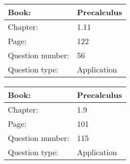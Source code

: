 \documentclass{article}
\begin{document}
            \paragraph{}
            \begin{tabularx}{1\textwidth}{
                    p{}
                    p{}
                }
                \toprule
                Book: & Precalculus
                \\
                \midrule
                Chapter: & 1.11
                \\
                \midrule
                Page: & 122
                \\
                \midrule
                Question number: & 56
                \\
                \midrule
                Question type: & Application
                \\
                \bottomrule
            \end{tabularx}
            
            \paragraph{}
            \begin{tabularx}{1\textwidth}{
                    p{}
                    p{}
                }
                \toprule
                Book: & Precalculus
                \\
                \midrule
                Chapter: & 1.9
                \\
                \midrule
                Page: & 101
                \\
                \midrule
                Question number: & 115
                \\
                \midrule
                Question type: & Application
                \\
                \bottomrule
            \end{tabularx}
            
\end{document}
